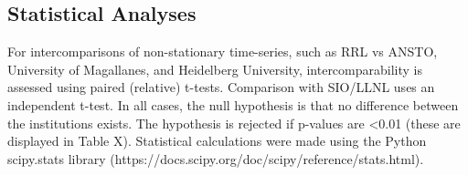 \subsection{Statistical Analyses}
For intercomparisons of non-stationary time-series, such as RRL vs ANSTO, University of Magallanes, and Heidelberg University, intercomparability is assessed using paired (relative) t-tests. Comparison with SIO/LLNL uses an independent t-test. In all cases, the null hypothesis is that no difference between the institutions exists. The hypothesis is rejected if p-values are <0.01 (these are displayed in Table X). Statistical calculations were made using the Python scipy.stats library (https://docs.scipy.org/doc/scipy/reference/stats.html).




